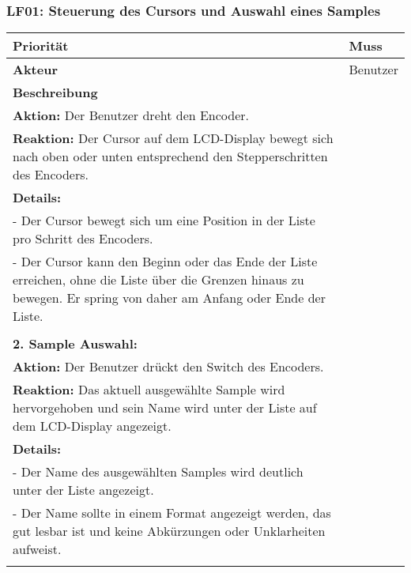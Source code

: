 \subsubsection{LF01: Steuerung des Cursors und Auswahl eines Samples}
	\hypertarget{LF01_Link}{}
\begin{longtable}[c]{|p{3cm}|p{13cm}|}
	\hline
	\textbf{Priorität} & Muss \\
	\hline
	\textbf{Akteur} & Benutzer \\
	\hline
	\textbf{Beschreibung} & 
	\begin{tabularx}{13cm}{X}
		\textbf{1. Cursor Bewegung:} \\
		\textbf{Aktion:} Der Benutzer dreht den Encoder. \\
		\textbf{Reaktion:} Der Cursor auf dem LCD-Display bewegt sich nach oben oder unten entsprechend den Stepperschritten des Encoders. \\
		\textbf{Details:} \\
		- Der Cursor bewegt sich um eine Position in der Liste pro Schritt des Encoders. \\
		- Der Cursor kann den Beginn oder das Ende der Liste erreichen, ohne die Liste über die Grenzen hinaus zu bewegen. Er spring von daher am Anfang oder Ende der Liste. \\
		\\
		\textbf{2. Sample Auswahl:} \\
		\textbf{Aktion:} Der Benutzer drückt den Switch des Encoders. \\
		\textbf{Reaktion:} Das aktuell ausgewählte Sample wird hervorgehoben und sein Name wird unter der Liste auf dem LCD-Display angezeigt. \\
		\textbf{Details:} \\
		- Der Name des ausgewählten Samples wird deutlich unter der Liste angezeigt. \\
		- Der Name sollte in einem Format angezeigt werden, das gut lesbar ist und keine Abkürzungen oder Unklarheiten aufweist. \\
	\end{tabularx} \\
	\hline
\end{longtable}

\newpage
